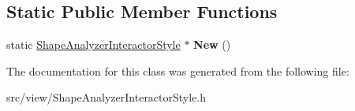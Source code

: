 \subsection*{Static Public Member Functions}
\begin{DoxyCompactItemize}
\item 
\hypertarget{class_shape_analyzer_interactor_style_a0bfab8bbe0c43915ab433e4faecde0ca}{}static \hyperlink{class_shape_analyzer_interactor_style}{Shape\+Analyzer\+Interactor\+Style} $\ast$ {\bfseries New} ()\label{class_shape_analyzer_interactor_style_a0bfab8bbe0c43915ab433e4faecde0ca}

\end{DoxyCompactItemize}


The documentation for this class was generated from the following file\+:\begin{DoxyCompactItemize}
\item 
src/view/Shape\+Analyzer\+Interactor\+Style.\+h\end{DoxyCompactItemize}
